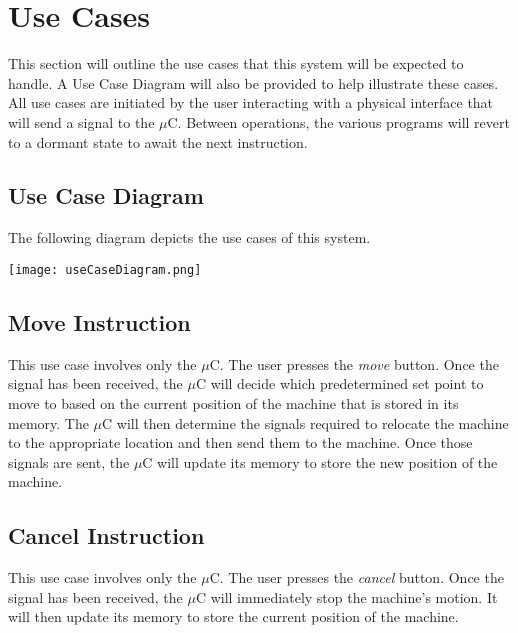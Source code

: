 \documentclass[titlepage]{article}
\begin{document}
\section{Use Cases}
This section will outline the use cases that this system will be expected to handle. A Use Case Diagram will also be provided to help illustrate these cases. All use cases are initiated by the user interacting with a physical interface that will send a signal to the $\mu$C. Between operations, the various programs will revert to a dormant state to await the next instruction.
\subsection{Use Case Diagram}%
The following diagram depicts the use cases of this system.\\
\begin{center}
	\texttt{[image: useCaseDiagram.png]}
\label{fig:use case diagram}
\end{center}
\subsection{Move Instruction}
This use case involves only the $\mu$C. The user presses the \textit{move} button. Once the signal has been received, the $\mu$C will decide which predetermined set point to move to based on the current position of the machine that is stored in its memory. The $\mu$C will then determine the signals required to relocate the machine to the appropriate location and then send them to the machine. Once those signals are sent, the $\mu$C will update its memory to store the new position of the machine.
\subsection{Cancel Instruction}
This use case involves only the $\mu$C. The user presses the \textit{cancel} button. Once the signal has been received, the $\mu$C will immediately stop the machine's motion. It will then update its memory to store the current position of the machine.
\end{document}
